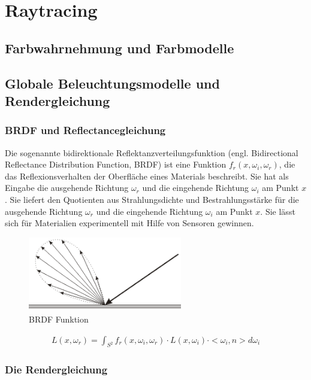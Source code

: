 \section{Raytracing}

\subsection{Farbwahrnehmung und Farbmodelle}
\subsection{Globale Beleuchtungsmodelle und Rendergleichung}
\subsubsection{BRDF und Reflectancegleichung }
Die sogenannte bidirektionale Reflektanzverteilungsfunktion (engl. Bidirectional Reflectance Distribution Function, BRDF)
ist eine Funktion $f_r (x, \omega_i, \omega_r)$, die das Reflexionsverhalten der Oberfläche eines Materials beschreibt. 
Sie hat als Eingabe die ausgehende Richtung $\omega_r$ und die eingehende Richtung  $\omega_i$ am Punkt $x$. 
Sie  liefert den Quotienten aus Strahlungsdichte und Bestrahlungsstärke für die ausgehende Richtung $\omega_r$ und die eingehende Richtung  $\omega_i$ am Punkt $x$.
Sie lässt sich für Materialien experimentell mit Hilfe von Sensoren gewinnen. 

 \begin{figure}[H]
    \centering
    \includegraphics[width=0.6\textwidth]{images/brdf2.png}
    \caption{BRDF Funktion}
    \label{fig:raytracin_brdf}
\end{figure}

\begin{align*}
L(x, \omega_r) = \int_{S^2}f_r (x, \omega_i, \omega_r) \cdot L(x, \omega_i) \cdot <\omega_i, n> d\omega_i
\end{align*}
 
\subsubsection{Die Rendergleichung}

